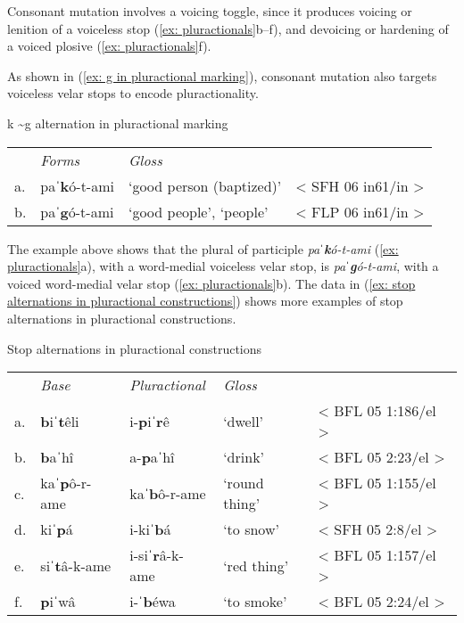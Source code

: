 Consonant mutation involves a voicing toggle, since it produces voicing or lenition of a voiceless stop (\ref{ex: pluractionals}b--f), and devoicing or hardening of a voiced plosive (\ref{ex: pluractionals}f).

As shown in (\ref{ex: g in pluractional marking}), consonant mutation also targets voiceless velar stops to encode pluractionality.

\ea\label{ex: g in pluractional marking}
{k \textasciitilde g alternation in pluractional marking}

\begin{tabular}{llll}
    & \textit{Forms} & \textit{Gloss} & \\
     a. &  {paˈ\textbf{k}ó-t-ami}&{‘good person (baptized)’}&{< SFH 06 in61/in >}\\
     b. & {paˈ\textbf{g}ó-t-ami}&{‘good people’, ‘people’}&{< FLP 06 in61/in >}\\
\end{tabular}

\z

The example above shows that the plural of participle \textit{paˈ}\textbf{\textit{k}}\textit{ó-t-ami} (\ref{ex: pluractionals}a), with a word-medial voiceless velar stop, is \textit{paˈ}\textbf{\textit{g}}\textit{ó-t-ami}, with a voiced word-medial velar stop (\ref{ex: pluractionals}b). The data in (\ref{ex: stop alternations in pluractional constructions}) shows more examples of stop alternations in pluractional constructions.

\ea\label{ex: stop alternations in pluractional constructions}
{Stop alternations in pluractional constructions}

\begin{tabular}{lllll}
 & \textit{Base} & \textit{Pluractional} & \textit{Gloss} &\\
     a. &  \textbf{b}iˈ\textbf{t}êli & {i-\textbf{p}iˈ\textbf{r}ê} & {`dwell'}& {< BFL 05 1:186/el >}\\
     b. & {\textbf{b}aˈhî}&{a-\textbf{p}aˈhî}&{`drink'}&   {< BFL 05 2:23/el >}\\
     c. & {kaˈ\textbf{p}ô-r-ame}&{kaˈ\textbf{b}ô-r-ame}&{`round thing'}&      {< BFL 05 1:155/el >}\\
     d. & {kiˈ\textbf{p}á}&{i-kiˈ\textbf{b}á}&{`to snow'}&   {< SFH 05 2:8/el >}\\
     e. & {siˈ\textbf{t}â-k-ame}&{i-siˈ\textbf{r}â-k-ame}&{`red thing'}&  { < BFL 05 1:157/el >}\\
     f. & {\textbf{p}iˈwâ}&{i-ˈ\textbf{b}éwa}&{`to smoke'}&  {< BFL 05 2:24/el >}\\
\end{tabular}
    \z


